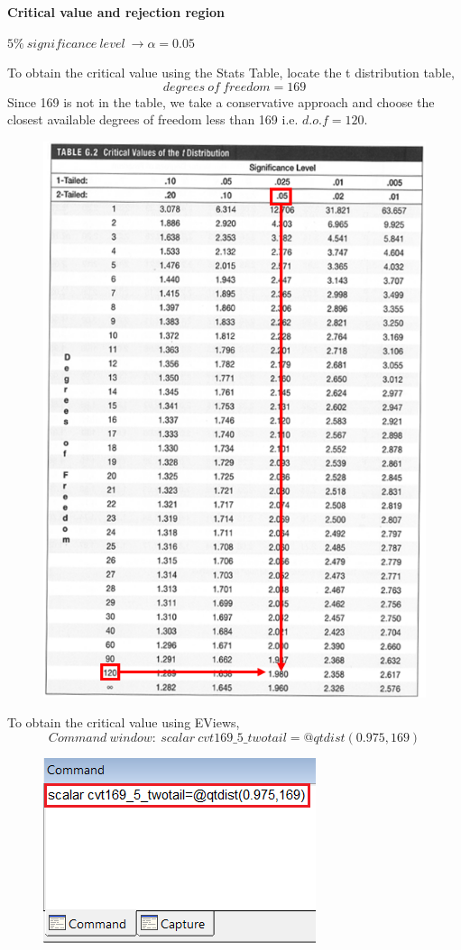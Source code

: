 \documentclass[12pt]{report}
\begin{document}
\noindent \textbf{Critical value and rejection region}

\noindent $5\%\ significance\ level\ \to \alpha = 0.05$

\noindent To obtain the critical value using the Stats Table, locate the t distribution table,
$$degrees\ of\ freedom = 169$$
\noindent Since 169 is not in the table, we take a conservative approach and choose the closest available degrees of freedom less than 169 i.e. $d.o.f=120$. 
\begin{figure}[H]
	\centering
	\includegraphics{q1_11}
\end{figure}
\vspace{-\baselineskip}
\noindent To obtain the critical value using EViews,
$$Command\ window:\ scalar\ cvt169\_5\_twotail=@qtdist(0.975,169)$$
\begin{figure}[H]
	\centering
	\includegraphics{q1_12}
\end{figure}
\end{document}
